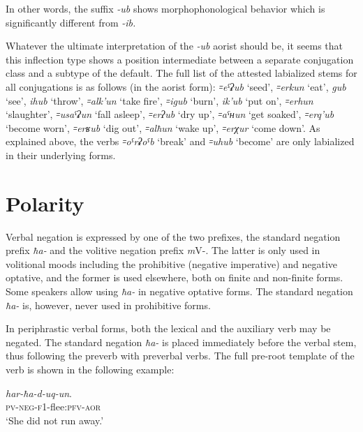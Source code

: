 \documentclass[output=paper]{langsci/langscibook}
\begin{document}

In other words, the suffix \emph{-ub} shows morphophonological behavior
which is significantly different from \emph{-ib.}


Whatever the ultimate interpretation of the \emph{-ub} aorist should be,
it seems that this inflection type shows a position intermediate between
a separate conjugation class and a subtype of the default. The full list
of the attested labialized stems for all conjugations is as follows (in
the aorist form): \emph{꞊eˤʡub} `seed', \emph{꞊erkun} `eat', \emph{gub}
`see', \emph{ihub} `throw', \emph{꞊alk'un} `take fire', \emph{꞊igub}
`burn', \emph{ik'ub} `put on', \emph{꞊erhun} `slaughter', \emph{꞊usaˤʡun}
`fall asleep', \emph{꞊erʔub} `dry up', \emph{꞊aˤʜun} `get soaked',
\emph{꞊erq'ub} `become worn', \emph{꞊erʁub} `dig out', \emph{꞊alħun}
`wake up', \emph{꞊erχur} `come down'. As explained above, the verbs
\emph{꞊oˤrʡoˤb} `break' and \emph{꞊uhub} `become' are only labialized in
their underlying forms.


\section{Polarity}\label{polarity}


Verbal negation is expressed by one of the two prefixes, the standard
negation prefix \emph{ħa-} and the volitive negation prefix \emph{m}V-.
The latter is only used in volitional moods including the prohibitive
(negative imperative) and negative optative, and the former is used
elsewhere, both on finite and non-finite forms. Some speakers allow
using \emph{ħa-} in negative optative forms. The standard negation
\emph{ħa-} is, however, never used in prohibitive forms.

In periphrastic verbal forms, both the lexical and the auxiliary verb
may be negated. The standard negation \emph{ħa-} is placed immediately
before the verbal stem, thus following the preverb with preverbal verbs.
The full pre-root template of the verb is shown in the following
example:

\ea %
\gll \emph{har-ħa-d-uq-un}.\\
\textsc{pv}-\textsc{neg}-\textsc{f1}-flee:\textsc{pfv}-\textsc{aor}\\
\glt `She did not run away.'
\z
\end{document}
